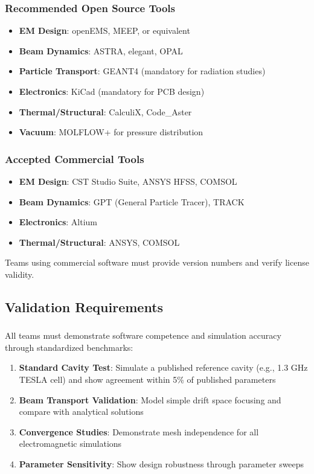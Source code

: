 \subsubsection{Recommended Open Source Tools}
\begin{itemize}[noitemsep]
    \item \textbf{EM Design}: openEMS, MEEP, or equivalent
    \item \textbf{Beam Dynamics}: ASTRA, elegant, OPAL
    \item \textbf{Particle Transport}: GEANT4 (mandatory for radiation studies)
    \item \textbf{Electronics}: KiCad (mandatory for PCB design)
    \item \textbf{Thermal/Structural}: CalculiX, Code\_Aster
    \item \textbf{Vacuum}: MOLFLOW+ for pressure distribution
\end{itemize}

\subsubsection{Accepted Commercial Tools}
\begin{itemize}[noitemsep]
    \item \textbf{EM Design}: CST Studio Suite, ANSYS HFSS, COMSOL
    \item \textbf{Beam Dynamics}: GPT (General Particle Tracer), TRACK
    \item \textbf{Electronics}: Altium
    \item \textbf{Thermal/Structural}: ANSYS, COMSOL
\end{itemize}

Teams using commercial software must provide version numbers and verify license validity.

\subsection{Validation Requirements}

\subsubsection{}
All teams must demonstrate software competence and simulation accuracy through standardized benchmarks:

\begin{enumerate}[noitemsep]
    \item \textbf{Standard Cavity Test}: Simulate a published reference cavity (e.g., 1.3 GHz TESLA cell) and show agreement within 5\% of published parameters
    \item \textbf{Beam Transport Validation}: Model simple drift space focusing and compare with analytical solutions
    \item \textbf{Convergence Studies}: Demonstrate mesh independence for all electromagnetic simulations
    \item \textbf{Parameter Sensitivity}: Show design robustness through parameter sweeps
\end{enumerate}

